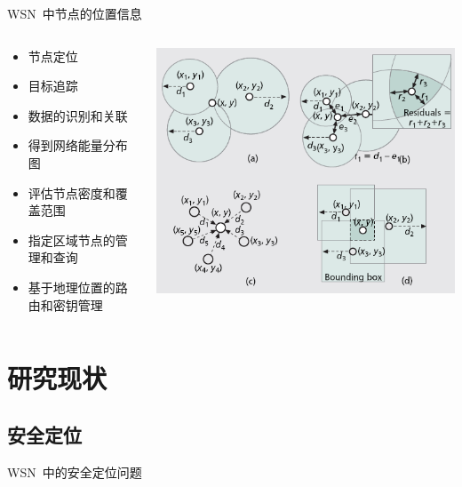 \documentclass[mathserif,compress,CJKutf8, red]{beamer}
\begin{document}
\begin{CJK*}{UTF8}{song}
\begin{frame}{WSN~中节点的位置信息}
\begin{columns}
  \begin{column}{0.5\textwidth}
\begin{itemize}
\item 节点定位
\item 目标追踪
\item 数据的识别和关联
\item 得到网络能量分布图
\item 评估节点密度和覆盖范围
\item 指定区域节点的管理和查询
\item 基于地理位置的路由和密钥管理
\end{itemize}
  \end{column}
  \begin{column}{0.5\textwidth}
  \includegraphics[width=\textwidth]{images/localization.png}
  \end{column}
\end{columns}
\end{frame}

\section{研究现状}

\subsection{安全定位}

\begin{frame}{WSN~中的安全定位问题}


\end{frame}
\end{CJK*}
\end{document}

